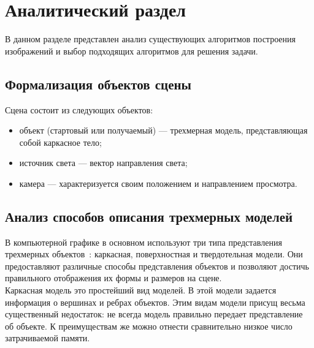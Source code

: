 \chapter{Аналитический раздел}

В данном разделе представлен анализ существующих алгоритмов построения изображений и выбор подходящих алгоритмов для решения задачи.

\section{Формализация объектов сцены}
Сцена состоит из следующих объектов:

\begin{itemize}[label*=---]
	\item объект (стартовый или получаемый) --- трехмерная модель, представляющая собой каркасное тело;
	\item источник света --- вектор направления света;
	\item камера --- характеризуется своим положением и направлением просмотра.
\end{itemize}

\newpage

\section{Анализ способов описания трехмерных моделей}

В компьютерной графике в основном используют три типа представления трехмерных объектов~\cite{Kosnikov}: каркасная, поверхностная и твердотельная модели.
Они предоставляют различные способы представления объектов и позволяют 
достичь правильного отображения их формы и размеров на сцене.\\ %


Каркасная модель это простейший вид моделей. В этой модели задается информация о вершинах и ребрах объектов. Этим видам модели присущ весьма существенный недостаток: не всегда модель правильно передает представление об объекте. К преимуществам же можно отнести сравнительно низкое число затрачиваемой памяти.\\


